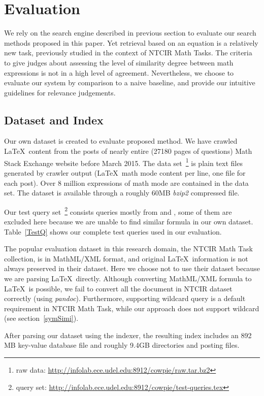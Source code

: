 \section{Evaluation}
We rely on the search engine described in previous section to evaluate our search methods proposed in this paper.
Yet retrieval based on an equation is a relatively new task, previously studied in the context of NTCIR Math Tasks. 
The criteria to give judges about assessing the level of similarity degree between math expressions is not in a high level of agreement.
Nevertheless, we choose to evaluate our system by comparison to a naive baseline, and provide our intuitive guidelines for relevance judgements.

\subsection{Dataset and Index}
\label{datasetAndIndex}
Our own dataset is created to evaluate proposed method.
We have crawled \LaTeX\ content from the posts of nearly entire (27180 pages of questions) Math Stack Exchange website before March 2015. 
The data set~\footnote{raw data: \url{http://infolab.ece.udel.edu:8912/cowpie/raw.tar.bz2} }
is plain text files generated by crawler output (\LaTeX\ math mode content per line, one file for each post).  
Over 8 million expressions of math mode are contained in the data set. 
The dataset is available through a roughly 60MB \textit{bzip2} compressed file.

Our test query set~\footnote{query set: \url{http://infolab.ece.udel.edu:8912/cowpie/test-queries.tex}} 
consists queries mostly from \cite{ntcirtopic} and \cite{symbolpairs15}, some of them are excluded here because we are unable to find similar formula in our own dataset.
Table~\ref{TestQ} shows our complete test queries used in our evaluation. 

The popular evaluation dataset in this research domain, the NTCIR Math Task collection, is in MathML/XML format, and original \LaTeX\ information is not always preserved in their dataset. 
Here we choose not to use their dataset because we are parsing \LaTeX\ directly.
Although converting MathML/XML formula to \LaTeX\ is possible, we fail to convert all the document in NTCIR dataset correctly (using \textit{pandoc}).
Furthermore, supporting wildcard query is a default requirement in NTCIR Math Task, while our approach does not support wildcard (see section~\ref{symSimi}).

After parsing our dataset using the indexer, the resulting index includes an 892 MB key-value database file and roughly 9.4GB directories and posting files.

